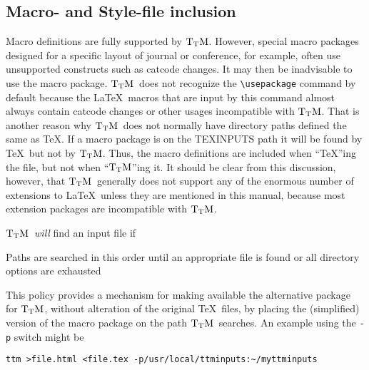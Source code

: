 \documentclass[12pt]{article}
\def\TtM{$\rm{}T_TH$}
\def\TtM{$\rm{}T_TM$}%
\begin{document}
\subsection{Macro- and Style-file 
inclusion }
\label{texins}
Macro definitions are fully supported by \TtM. However, special macro
packages designed for a specific layout of journal or conference, for
example, often use unsupported constructs such as catcode changes. It
may then be inadvisable to use the macro package.  \TtM\ does not
recognize the \verb!\usepackage! command by default because the
\LaTeX\ macros that are input by this command almost always contain
catcode changes or other usages incompatible with \TtM. That is
another reason why \TtM\ does not normally have directory paths
defined the same as \TeX. If a macro package is on the TEXINPUTS path
it will be found by \TeX\ but not by \TtM.  Thus, the macro
definitions are included when ``\TeX''ing the file, but not when
``\TtM''ing it.  It should be clear from this discussion, however,
that \TtM\ generally does not support any of the enormous number of
extensions to \LaTeX\ unless they are mentioned in this manual,
because most extension packages are incompatible with \TtM.

\TtM\ \emph{will} find an input file if 
Paths are searched in this order until an appropriate file is
found or all directory options are exhausted

 This policy provides a mechanism
for making available the alternative package for \TtM,
without alteration of the original \TeX\ files, by placing the
(simplified) version of the macro package on the path \TtM\ searches.
 An example using the \verb!-p! switch might be
\begin{verbatim}
ttm >file.html <file.tex -p/usr/local/ttminputs:~/myttminputs
\end{verbatim}
\end{document}
